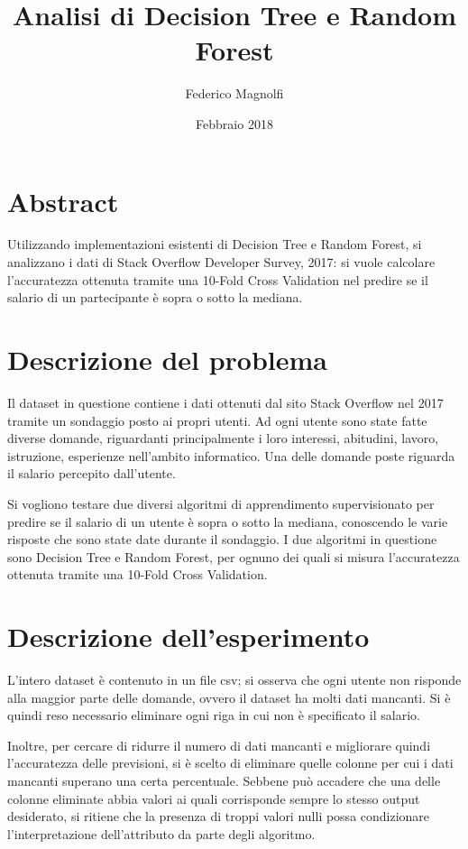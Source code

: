 \documentclass[]{article}
\newcommand{\subtitle}[1]{%
  \posttitle{%
    \par\end{center}
    \begin{center}\large#1\end{center}
    \vskip0.5em}%
}
\begin{document}
\title{Analisi di Decision Tree e Random Forest}
\subtitle{Intelligenza Artificiale}
\author{Federico Magnolfi}
\date{Febbraio 2018}
\maketitle

\section*{Abstract}
Utilizzando implementazioni esistenti di Decision Tree e Random Forest, si analizzano i dati di Stack Overflow Developer Survey, 2017: si vuole calcolare l'accuratezza ottenuta tramite una 10-Fold Cross Validation nel predire se il salario di un partecipante è sopra o sotto la mediana.

\section*{Descrizione del problema}
Il dataset in questione contiene i dati ottenuti dal sito Stack Overflow nel 2017 tramite un sondaggio posto ai propri utenti. Ad ogni utente sono state fatte diverse domande, riguardanti principalmente i loro interessi, abitudini, lavoro, istruzione, esperienze nell'ambito informatico. Una delle domande poste riguarda il salario percepito dall'utente.

Si vogliono testare due diversi algoritmi di apprendimento supervisionato per predire se il salario di un utente è sopra o sotto la mediana, conoscendo le varie risposte che sono state date durante il sondaggio. I due algoritmi in questione sono Decision Tree e Random Forest, per ognuno dei quali si misura l'accuratezza ottenuta tramite una 10-Fold Cross Validation.

\section*{Descrizione dell'esperimento}
L'intero dataset è contenuto in un file csv; si osserva che ogni utente non risponde alla maggior parte delle domande, ovvero il dataset ha molti dati mancanti. Si è quindi reso necessario eliminare ogni riga in cui non è specificato il salario.

Inoltre, per cercare di ridurre il numero di dati mancanti e migliorare quindi l'accuratezza delle previsioni, si è scelto di eliminare quelle colonne per cui i dati mancanti superano una certa percentuale. Sebbene può accadere che una delle colonne eliminate abbia valori ai quali corrisponde sempre lo stesso output desiderato, si ritiene che la presenza di troppi valori nulli possa condizionare l'interpretazione dell'attributo da parte degli algoritmo.
\end{document}
